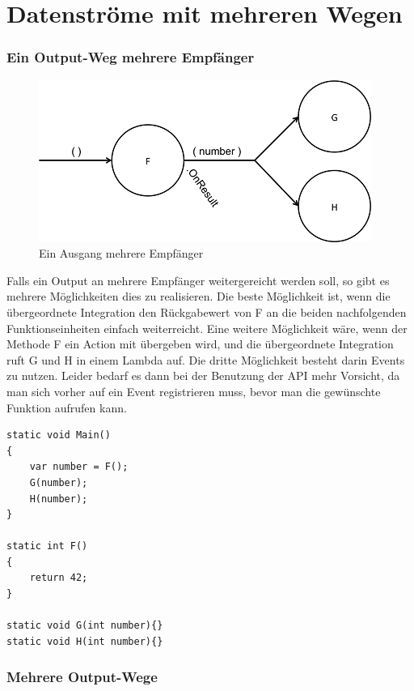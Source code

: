 \section{Datenströme mit mehreren Wegen}

\subsubsection{Ein Output-Weg mehrere Empfänger}

\begin{figure}[H]
	\centering
	\includegraphics[width=.7\linewidth]{./img/diagramOut1to2.png}
	\caption{Ein Ausgang mehrere Empfänger}
\end{figure}


Falls ein Output an mehrere Empfänger weitergereicht werden soll, so gibt es
mehrere Möglichkeiten dies zu realisieren.
Die beste Möglichkeit ist, wenn die übergeordnete Integration den Rückgabewert
von F an die beiden nachfolgenden Funktionseinheiten einfach weiterreicht.
Eine weitere Möglichkeit wäre, wenn der Methode F ein Action mit übergeben wird,
und die übergeordnete Integration ruft G und H in einem Lambda auf.
Die dritte Möglichkeit besteht darin Events zu nutzen.
Leider bedarf es dann bei der Benutzung der API mehr Vorsicht, da man sich vorher auf ein Event registrieren muss, bevor man
die gewünschte Funktion aufrufen kann.

\begin{lstlisting}[caption= Mehrere Empfänger eines Outputs]
static void Main()
{ 
    var number = F();
    G(number);
    H(number);
}

static int F()
{
	return 42;
}

static void G(int number){}
static void H(int number){}
\end{lstlisting}




\subsubsection{Mehrere Output-Wege}

